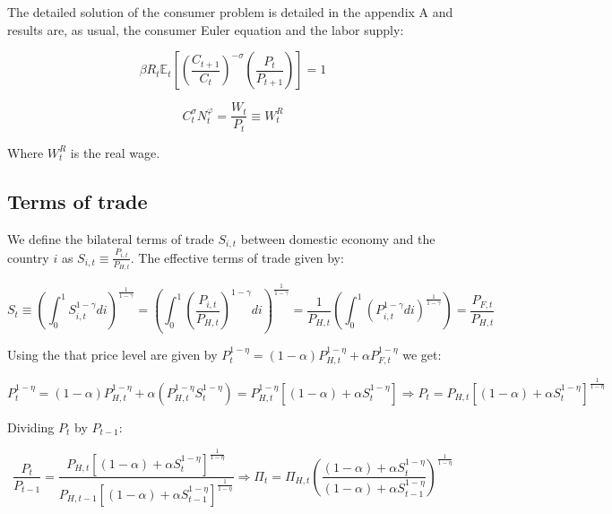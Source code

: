 \documentclass{article}
\newcommand{\Et}{\mathbb{E}_t}
\begin{document}

The detailed solution of the consumer problem is detailed in the appendix A and results are, as usual, the consumer Euler equation and the labor supply:

\begin{equation}
    \label{euler}
    \beta R_t \Et\left[\left(\frac{C_{t+1}}{C_t} \right)^{-\sigma} \left(\frac{P_t}{P_{t+1}} \right) \right] = 1
\end{equation}

\begin{equation}
    \label{labour_supply}
    C_t^\sigma N_t^\varphi = \frac{W_t}{P_t} \equiv W_t^R
\end{equation}

Where $W_t^R$ is the real wage.

\subsection{Terms of trade}
We define the bilateral terms of trade $S_{i,t}$ between domestic economy and the country $i$ as $S_{i,t} \equiv \frac{P_{i,t}}{P_{H,t}}$. The effective terms of trade given by:

\begin{equation}
    S_t \equiv \left(\int^1_0 S_{i,t}^{1-\gamma} di \right)^{\frac{1}{1-\gamma}} = \left(\int^1_0 \left(\frac{P_{i,t}}{P_{H,t}}  \right)^{1-\gamma}  di \right)^{\frac{1}{1-\gamma}} = \frac{1}{P_{H,t}} \left(\int^1_0 \left(P_{i,t}^{1-\gamma} di \right)^{\frac{1}{1-\gamma}}\right) = \frac{P_{F,t}}{P_{H,t}}
\end{equation}

Using the that price level are given by $P_t^{1-\eta} = (1-\alpha) P_{H,t}^{1-\eta} + \alpha P_{F,t}^{1-\eta}$ we get:

\begin{equation}
    \label{tot_level}
    P_t^{1-\eta} = (1-\alpha) P_{H,t}^{1-\eta} + \alpha \left( P_{H,t}^{1-\eta} S_{t}^{1-\eta} \right) = P_{H,t}^{1-\eta} \left[(1-\alpha) + \alpha S_t^{1-\eta} \right] \Rightarrow P_t = P_{H,t} \left[(1-\alpha) + \alpha S_t^{1-\eta} \right]^{\frac{1}{1-\eta}} 
\end{equation}

Dividing $P_t$ by $P_{t-1}$:

\begin{equation}
    \label{tot}
    \frac{P_t}{P_{t-1}} = \frac{P_{H,t} \left[(1-\alpha) + \alpha S_t^{1-\eta} \right]^{\frac{1}{1-\eta}}} {P_{H,t-1} \left[(1-\alpha) + \alpha S_{t-1}^{1-\eta} \right]^{\frac{1}{1-\eta}}} \Rightarrow \Pi_t = \Pi_{H,t} \left(\frac{(1-\alpha) + \alpha S_t^{1-\eta}} {(1-\alpha) + \alpha S_{t-1}^{1-\eta}} \right)^{\frac{1}{1-\eta}}
\end{equation}
\end{document}
